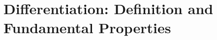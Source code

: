 \documentclass[../abcalc.tex]{subfiles}
\begin{document}
\chapter{Differentiation: Definition and Fundamental Properties}
\end{document}

